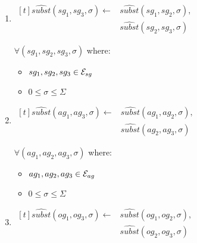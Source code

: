 \documentclass[10pt, twocolumn]{article}
\begin{document}
            \begin{enumerate}
              \item
                \begin{math}
                  \begin{aligned}[t]
                    \hat{subst}(sg_{1}, sg_{3}, \sigma) \leftarrow &
                    \hat{subst}(sg_{1}, sg_{2}, \sigma), \\
                    & \hat{subst}(sg_{2}, sg_{3}, \sigma)
                  \end{aligned}
                \end{math}

                $\forall (sg_{1}, sg_{2}, sg_{3}, \sigma)$ where:

                \begin{itemize}
                  \item
                    $sg_{1}, sg_{2}, sg_{3} \in {\cal E}_{sg}$
                  \item
                    $0 \leq \sigma \leq \Sigma$
                \end{itemize}
              \item
                \begin{math}
                  \begin{aligned}[t]
                    \hat{subst}(ag_{1}, ag_{3}, \sigma) \leftarrow &
                    \hat{subst}(ag_{1}, ag_{2}, \sigma), \\
                    & \hat{subst}(ag_{2}, ag_{3}, \sigma)
                  \end{aligned}
                \end{math}

                $\forall (ag_{1}, ag_{2}, ag_{3}, \sigma)$ where:

                \begin{itemize}
                  \item
                    $ag_{1}, ag_{2}, ag_{3} \in {\cal E}_{ag}$
                  \item
                    $0 \leq \sigma \leq \Sigma$
                \end{itemize}
              \item
                \begin{math}
                  \begin{aligned}[t]
                    \hat{subst}(og_{1}, og_{3}, \sigma) \leftarrow &
                    \hat{subst}(og_{1}, og_{2}, \sigma), \\
                    & \hat{subst}(og_{2}, og_{3}, \sigma)
                  \end{aligned}
                \end{math}


\end{enumerate}
\end{document}
